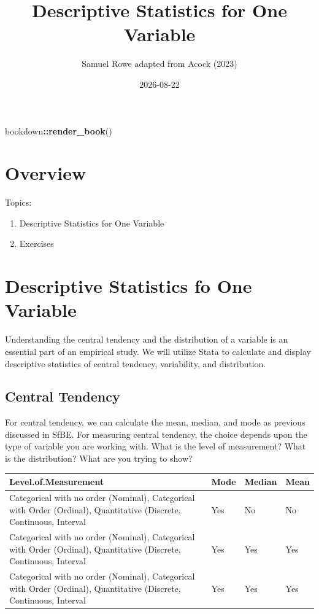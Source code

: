\documentclass[
]{book}
\title{Descriptive Statistics for One Variable}
\author{Samuel Rowe adapted from Acock (2023)}
\date{2026-08-22}
\newenvironment{Shaded}{\begin{snugshade}}{\end{snugshade}}
\newcommand{\FunctionTok}[1]{\textcolor[rgb]{0.13,0.29,0.53}{\textbf{#1}}}
\newcommand{\NormalTok}[1]{#1}
\newcommand{\SpecialCharTok}[1]{\textcolor[rgb]{0.81,0.36,0.00}{\textbf{#1}}}
\providecommand{\tightlist}{%
  \setlength{\itemsep}{0pt}\setlength{\parskip}{0pt}}
\begin{document}
\maketitle

{
\setcounter{tocdepth}{1}
\tableofcontents
}
\begin{Shaded}
\begin{Highlighting}[]
\NormalTok{bookdown}\SpecialCharTok{::}\FunctionTok{render\_book}\NormalTok{()}
\end{Highlighting}
\end{Shaded}

\chapter*{Overview}\label{overview}

Topics:

\begin{enumerate}
\def\labelenumi{\arabic{enumi}.}
\tightlist
\item
  Descriptive Statistics for One Variable
\item
  Exercises
\end{enumerate}

\chapter{Descriptive Statistics fo One Variable}\label{descriptive-statistics-fo-one-variable}

Understanding the central tendency and the distribution of a variable is an essential part of an empirical study. We will utilize Stata to calculate and display descriptive statistics of central tendency, variability, and distribution.

\section{Central Tendency}\label{central-tendency}

For central tendency, we can calculate the mean, median, and mode as previous discussed in SfBE. For measuring central tendency, the choice depends upon the type of variable you are working with. What is the level of measurement? What is the distribution? What are you trying to show?

\begin{tabular}{l|l|l|l}
\hline
Level.of.Measurement & Mode & Median & Mean\\
\hline
Categorical with no order (Nominal), Categorical with Order (Ordinal), Quantitative (Discrete, Continuous, Interval & Yes & No & No\\
\hline
Categorical with no order (Nominal), Categorical with Order (Ordinal), Quantitative (Discrete, Continuous, Interval & Yes & Yes & Yes\\
\hline
Categorical with no order (Nominal), Categorical with Order (Ordinal), Quantitative (Discrete, Continuous, Interval & Yes & Yes & Yes\\
\hline
\end{tabular}
\end{document}
